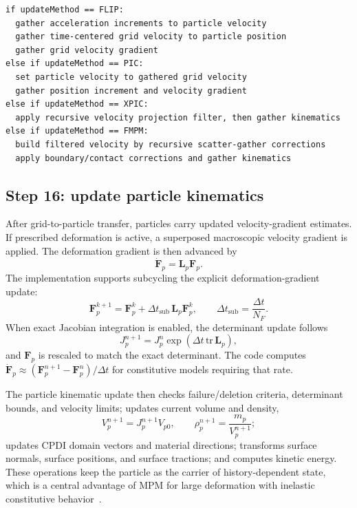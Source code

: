 \begin{lstlisting}[caption={Grid-to-particle transfer options.},basicstyle=\ttfamily\small]
if updateMethod == FLIP:
  gather acceleration increments to particle velocity
  gather time-centered grid velocity to particle position
  gather grid velocity gradient
else if updateMethod == PIC:
  set particle velocity to gathered grid velocity
  gather position increment and velocity gradient
else if updateMethod == XPIC:
  apply recursive velocity projection filter, then gather kinematics
else if updateMethod == FMPM:
  build filtered velocity by recursive scatter-gather corrections
  apply boundary/contact corrections and gather kinematics
\end{lstlisting}

\subsection{Step 16: update particle kinematics}
\label{subsec:solver-step-16}
After grid-to-particle transfer, particles carry updated velocity-gradient estimates.  If prescribed deformation is active, a superposed macroscopic velocity gradient is applied.  The deformation gradient is then advanced by
\begin{equation}
  \dot{\mathbf{F}}_p = \mathbf{L}_p\mathbf{F}_p.
\end{equation}
The implementation supports subcycling the explicit deformation-gradient update:
\begin{equation}
  \mathbf{F}_{p}^{k+1}=\mathbf{F}_{p}^{k}+\Delta t_{\mathrm{sub}}\,\mathbf{L}_p\mathbf{F}_{p}^{k},
  \qquad
  \Delta t_{\mathrm{sub}}=\frac{\Delta t}{N_F}.
\end{equation}
When exact Jacobian integration is enabled, the determinant update follows
\begin{equation}
  J_p^{n+1}=J_p^n\exp\left(\Delta t\,\mathrm{tr}\,\mathbf{L}_p\right),
\end{equation}
and $\mathbf{F}_p$ is rescaled to match the exact determinant.  The code computes $\dot{\mathbf{F}}_p\approx(\mathbf{F}^{n+1}_p-\mathbf{F}^{n}_p)/\Delta t$ for constitutive models requiring that rate.

The particle kinematic update then checks failure/deletion criteria, determinant bounds, and velocity limits; updates current volume and density,
\begin{equation}
  V_p^{n+1}=J_p^{n+1}V_{p0},\qquad
  \rho_p^{n+1}=\frac{m_p}{V_p^{n+1}};
\end{equation}
updates CPDI domain vectors and material directions; transforms surface normals, surface positions, and surface tractions; and computes kinetic energy.  These operations keep the particle as the carrier of history-dependent state, which is a central advantage of MPM for large deformation with inelastic constitutive behavior~\cite{sulsky1994history,sadeghirad2011cpdi}.

